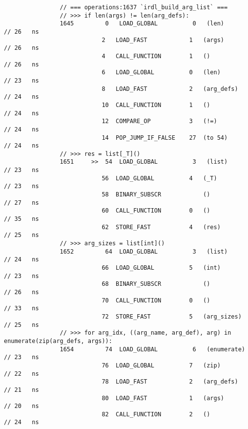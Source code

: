 \begin{code}
\begin{verbatim}
                // === operations:1637 `irdl_build_arg_list` ===
                // >>> if len(args) != len(arg_defs):
                1645         0   LOAD_GLOBAL          0   (len)                             // 26   ns
                            2   LOAD_FAST            1   (args)                             // 26   ns
                            4   CALL_FUNCTION        1   ()                                 // 26   ns
                            6   LOAD_GLOBAL          0   (len)                              // 23   ns
                            8   LOAD_FAST            2   (arg_defs)                         // 24   ns
                            10  CALL_FUNCTION        1   ()                                 // 24   ns
                            12  COMPARE_OP           3   (!=)                               // 24   ns
                            14  POP_JUMP_IF_FALSE    27  (to 54)                            // 24   ns
                // >>> res = list[_T]()
                1651     >>  54  LOAD_GLOBAL          3   (list)                            // 23   ns
                            56  LOAD_GLOBAL          4   (_T)                               // 23   ns
                            58  BINARY_SUBSCR            ()                                 // 27   ns
                            60  CALL_FUNCTION        0   ()                                 // 35   ns
                            62  STORE_FAST           4   (res)                              // 25   ns
                // >>> arg_sizes = list[int]()
                1652         64  LOAD_GLOBAL          3   (list)                            // 24   ns
                            66  LOAD_GLOBAL          5   (int)                              // 23   ns
                            68  BINARY_SUBSCR            ()                                 // 26   ns
                            70  CALL_FUNCTION        0   ()                                 // 33   ns
                            72  STORE_FAST           5   (arg_sizes)                        // 25   ns
                // >>> for arg_idx, ((arg_name, arg_def), arg) in enumerate(zip(arg_defs, args)):
                1654         74  LOAD_GLOBAL          6   (enumerate)                       // 23   ns
                            76  LOAD_GLOBAL          7   (zip)                              // 22   ns
                            78  LOAD_FAST            2   (arg_defs)                         // 21   ns
                            80  LOAD_FAST            1   (args)                             // 20   ns
                            82  CALL_FUNCTION        2   ()                                 // 24   ns

\end{verbatim}
\end{code}
